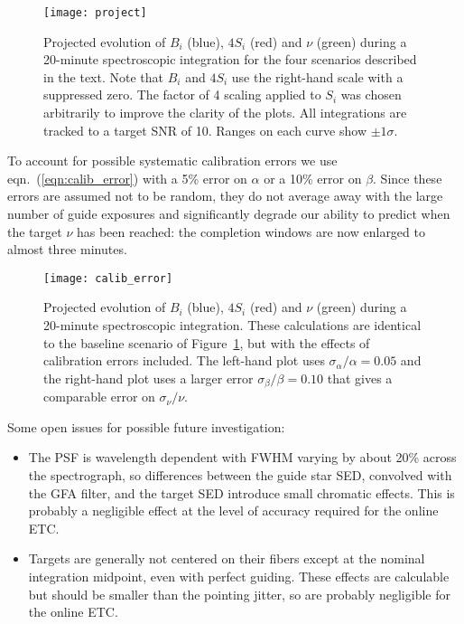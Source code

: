 \documentclass[11pt]{article}
\providecommand{\eqn}[1]{eqn.~(\ref{eqn:#1})}
\providecommand{\fig}[1]{Figure~\ref{fig:#1}}
\begin{document}
\begin{figure}[htb]
\begin{center}
\texttt{[image: project]}
\caption{Projected evolution of $B_i$ (blue), $4 S_i$ (red) and $\nu$ (green) during a 20-minute spectroscopic integration for the four scenarios described in the text. Note that $B_i$ and $4 S_i$ use the right-hand scale with a suppressed zero.  The factor of 4 scaling applied to $S_i$ was chosen arbitrarily to improve the clarity of the plots. All integrations are tracked to a target SNR of 10. Ranges on each curve show $\pm 1\sigma$.}
\label{fig:project}
\end{center}
\end{figure}

To account for possible systematic calibration errors we use \eqn{calib_error} with a 5\% error on $\alpha$ or a 10\% error on $\beta$. Since these errors are assumed not to be random, they do not average away with the large number of guide exposures and significantly degrade our ability to predict when the target $\nu$ has been reached: the completion windows are now enlarged to almost three minutes.

\begin{figure}[htb]
\begin{center}
\texttt{[image: calib\_error]}
\caption{Projected evolution of $B_i$ (blue), $4 S_i$ (red) and $\nu$ (green) during a 20-minute spectroscopic integration. These calculations are identical to the baseline scenario of \fig{project}, but with the effects of calibration errors included.  The left-hand plot uses $\sigma_\alpha/\alpha = 0.05$ and the right-hand plot uses a larger error $\sigma_\beta/\beta = 0.10$ that gives a comparable error on $\sigma_\nu/\nu$.}
\label{fig:calib_error}
\end{center}
\end{figure}

Some open issues for possible future investigation:
\begin{itemize}
\item The PSF is wavelength dependent with FWHM varying by about 20\% across the spectrograph, so differences between the guide star SED, convolved with the GFA filter, and the target SED introduce small chromatic effects. This is probably a negligible effect at the level of accuracy required for the online ETC.
\item Targets are generally not centered on their fibers except at the nominal integration midpoint, even with perfect guiding. These effects are calculable but should be smaller than the pointing jitter, so are probably negligible for the online ETC.
\end{itemize}
\end{document}
